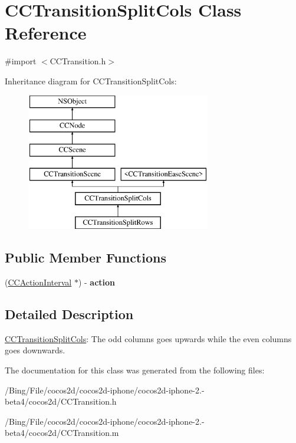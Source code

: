 \hypertarget{interface_c_c_transition_split_cols}{\section{C\-C\-Transition\-Split\-Cols Class Reference}
\label{interface_c_c_transition_split_cols}
}


{\ttfamily \#import $<$C\-C\-Transition.\-h$>$}

Inheritance diagram for C\-C\-Transition\-Split\-Cols\-:\begin{figure}[H]
\begin{center}
\leavevmode
\includegraphics[height=6.000000cm]{interface_c_c_transition_split_cols}
\end{center}
\end{figure}
\subsection*{Public Member Functions}
\begin{DoxyCompactItemize}
\item 
\hypertarget{interface_c_c_transition_split_cols_a8340de356a97389757e257e738077e6f}{(\hyperlink{class_c_c_action_interval}{C\-C\-Action\-Interval} $\ast$) -\/ {\bfseries action}}\label{interface_c_c_transition_split_cols_a8340de356a97389757e257e738077e6f}

\end{DoxyCompactItemize}


\subsection{Detailed Description}
\hyperlink{interface_c_c_transition_split_cols}{C\-C\-Transition\-Split\-Cols}\-: The odd columns goes upwards while the even columns goes downwards. 

The documentation for this class was generated from the following files\-:\begin{DoxyCompactItemize}
\item 
/\-Bing/\-File/cocos2d/cocos2d-\/iphone/cocos2d-\/iphone-\/2.-\/beta4/cocos2d/C\-C\-Transition.\-h\item 
/\-Bing/\-File/cocos2d/cocos2d-\/iphone/cocos2d-\/iphone-\/2.-\/beta4/cocos2d/C\-C\-Transition.\-m\end{DoxyCompactItemize}
